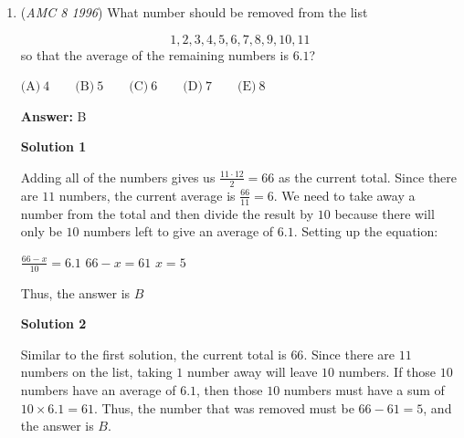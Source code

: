 \begin{enumerate}
\textbf{Solution}

Estimate each of the options.

 $A$ will give a number that is just over $3$.

 $B$ will give a number that is just under $3$.  This eliminates $B$, because $A$ is bigger.

 $C$ will give a number that is barely over $0$, since it is three times a tiny number.  This eliminates $C$, because $A$ is bigger.

 $D$ will give a huge number.  $\frac{1}{x}$ will get very, very large in magnitude when $x$ gets close to zero.  You can see this by examining the sequence $x=0.1$, which gives $10$ as the reciprocal, $x=0.01$, which gives $100$ as the reciprocal, and $x=0.001$, which gives $1000$ as the reciprocal.  Thus, $D$ will be huge, and this eliminates $A$.

 $E$ will give a small number, since you're dividing a tiny number into thirds.  This eliminates $E$, and gives $\boxed{D}$ as the answer.

 


	\item (\textit{AMC 8 1996}) What number should be removed from the list

 \[1,2,3,4,5,6,7,8,9,10,11\]
so that the average of the remaining numbers is $6.1$?


 $\text{(A)}\ 4 \qquad \text{(B)}\ 5 \qquad \text{(C)}\ 6 \qquad \text{(D)}\ 7 \qquad \text{(E)}\ 8$

 \textbf{Answer: }B



\textbf{Solution 1}

Adding all of the numbers gives us $\frac{11\cdot12}{2}=66$ as the current total. Since there are $11$ numbers, the current average is $\frac{66}{11}=6$. We need to take away a number from the total and then divide the result by $10$ because there will only be $10$ numbers left to give an average of $6.1$. Setting up the equation:

 $\frac{66-x}{10}=6.1$
$66 - x = 61$
$x = 5$

 Thus, the answer is $\boxed{B}$




\textbf{Solution 2}

Similar to the first solution, the current total is $66$.  Since there are $11$ numbers on the list, taking $1$ number away will leave $10$ numbers.  If those $10$ numbers have an average of $6.1$, then those $10$ numbers must have a sum of $10 \times 6.1 = 61$.  Thus, the number that was removed must be $66 - 61 = 5$, and the answer is $\boxed{B}$.


\end{enumerate}
